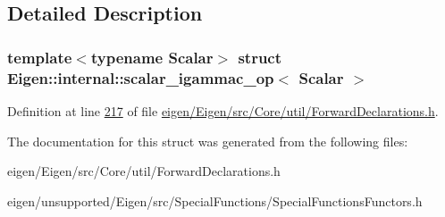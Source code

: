\subsection{Detailed Description}
\subsubsection*{template$<$typename Scalar$>$\newline
struct Eigen\+::internal\+::scalar\+\_\+igammac\+\_\+op$<$ Scalar $>$}



Definition at line \hyperlink{eigen_2_eigen_2src_2_core_2util_2_forward_declarations_8h_source_l00217}{217} of file \hyperlink{eigen_2_eigen_2src_2_core_2util_2_forward_declarations_8h_source}{eigen/\+Eigen/src/\+Core/util/\+Forward\+Declarations.\+h}.



The documentation for this struct was generated from the following files\+:\begin{DoxyCompactItemize}
\item 
eigen/\+Eigen/src/\+Core/util/\+Forward\+Declarations.\+h\item 
eigen/unsupported/\+Eigen/src/\+Special\+Functions/\+Special\+Functions\+Functors.\+h\end{DoxyCompactItemize}
